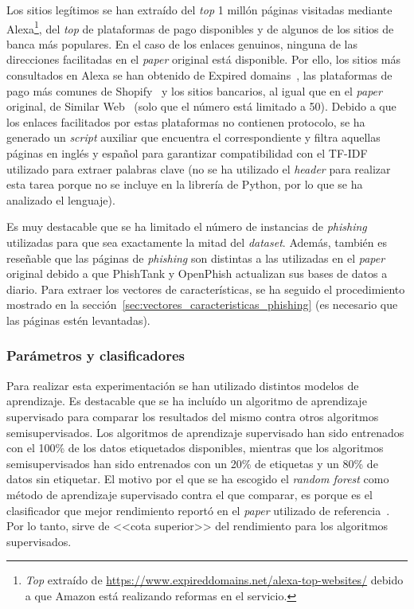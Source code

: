 Los sitios legítimos se han extraído del \textit{top} 1 millón páginas visitadas mediante Alexa\footnote{\textit{Top} extraído de \url{https://www.expireddomains.net/alexa-top-websites/} debido a que Amazon está realizando reformas en el servicio.}, del \textit{top} de plataformas de pago disponibles y de algunos de los sitios de banca más populares. En el caso de los enlaces genuinos, ninguna de las direcciones facilitadas en el \textit{paper} original está disponible. Por ello, los sitios más consultados en Alexa se han obtenido de Expired domains~\cite{AlexaTopWebsites}, las plataformas de pago más comunes de Shopify~\cite{paymentGatewaysWebsites} y los sitios bancarios, al igual que en el \textit{paper} original, de Similar Web~\cite{banksitesTop} (solo que el número está limitado a 50). Debido a que los enlaces facilitados por estas plataformas no contienen protocolo, se ha generado un \textit{script} auxiliar que encuentra el correspondiente y filtra aquellas páginas en inglés y español para garantizar compatibilidad con el TF-IDF utilizado para extraer palabras clave (no se ha utilizado el \textit{header} para realizar esta tarea porque no se incluye en la librería de Python, por lo que se ha analizado el lenguaje).

Es muy destacable que se ha limitado el número de instancias de \textit{phishing} utilizadas para que sea exactamente la mitad del \textit{dataset}. Además, también es reseñable que las páginas de \textit{phishing} son distintas a las utilizadas en el \textit{paper} original debido a que PhishTank y OpenPhish actualizan sus bases de datos a diario. Para extraer los vectores de características, se ha seguido el procedimiento mostrado en la sección~\ref{sec:vectores_caracteristicas_phishing} (es necesario que las páginas estén levantadas).

\subsubsection{Parámetros y clasificadores}

Para realizar esta experimentación se han utilizado distintos modelos de aprendizaje. Es destacable que se ha incluído un algoritmo de aprendizaje supervisado para comparar los resultados del mismo contra otros algoritmos semisupervisados. Los algoritmos de aprendizaje supervisado han sido entrenados con el 100\% de los datos etiquetados disponibles, mientras que los algoritmos semisupervisados han sido entrenados con un 20\% de etiquetas y un 80\% de datos sin etiquetar. El motivo por el que se ha escogido el \textit{random forest} como método de aprendizaje supervisado contra el que comparar, es porque es el clasificador que mejor rendimiento reportó en el \textit{paper} utilizado de referencia~\cite{featuresPhishing2018Gupta}. Por lo tanto, sirve de <<cota superior>> del rendimiento para los algoritmos supervisados.

